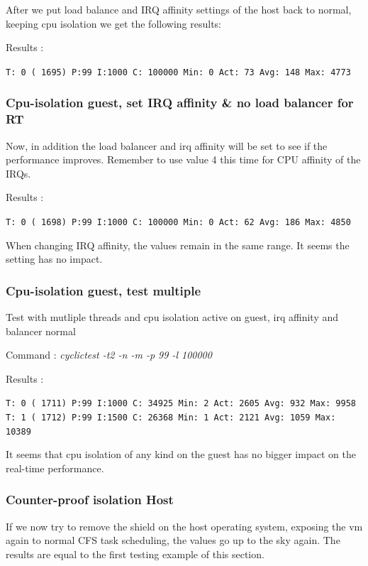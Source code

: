 \documentclass[]{scrartcl}
\begin{document}
After we put load balance and IRQ affinity settings of the host back to normal, keeping cpu isolation we get the following results:

\bigskip

\noindent Results :

\noindent \texttt{T: 0 ( 1695) P:99 I:1000 C: 100000 Min:      0 Act:   73 Avg:  148 Max:    4773}

\subsubsection{Cpu-isolation guest, set IRQ affinity \& no load balancer for RT}

Now, in addition the load balancer and irq affinity will be set to see if the performance improves. Remember to use value 4 this time for CPU affinity of the IRQs.
\bigskip

\noindent Results :

\noindent \texttt{T: 0 ( 1698) P:99 I:1000 C: 100000 Min:      0 Act:   62 Avg:  186 Max:    4850}

When changing IRQ affinity, the values remain in the same range. It seems the setting has no impact.

\subsubsection{Cpu-isolation guest, test multiple}

Test with mutliple threads and cpu isolation active on guest, irq affinity and balancer normal

\noindent Command : \textit{cyclictest -t2 -n -m -p 99 -l 100000}

\noindent Results :

\noindent  
\texttt{T: 0 ( 1711) P:99 I:1000 C:  34925 Min:      2 Act: 2605 Avg:  932 Max:    9958}
\noindent
\texttt{T: 1 ( 1712) P:99 I:1500 C:  26368 Min:      1 Act: 2121 Avg: 1059 Max:   10389}

It seems that cpu isolation of any kind on the guest has no bigger impact on the real-time performance.

\subsubsection{Counter-proof isolation Host}

If we now try to remove the shield on the host operating system, exposing the vm again to normal CFS task scheduling, the values go up to the sky again. The results are equal to the first testing example of this section.
\end{document}
